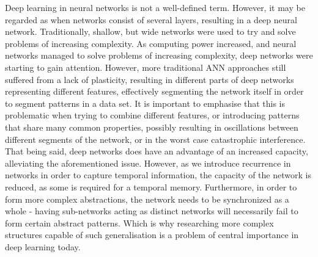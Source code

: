 
Deep learning in neural networks is not a well-defined term. However, it may be regarded as when networks consist of several layers, resulting in a deep neural network.
Traditionally, shallow, but wide networks were used to try and solve problems of increasing complexity.
As computing power increased, and neural networks managed to solve problems of increasing complexity, deep networks were starting to gain attention. However, more traditional ANN approaches still suffered from a lack of plasticity, resulting in different parts of deep networks representing different features, effectively segmenting the network itself in order to segment patterns in a data set. It is important to emphasise that this is problematic when trying to combine different features, or introducing patterns that share many common properties, possibly resulting in oscillations between different segments of the network, or in the worst case catastrophic interference.
That being said, deep networks does have an advantage of an increased capacity, alleviating the aforementioned issue. However, as we introduce recurrence in networks in order to capture temporal information, the capacity of the network is reduced, as some is required for a temporal memory. Furthermore, in order to form more complex abstractions, the network needs to be synchronized as a whole - having sub-networks acting as distinct networks will necessarily fail to form certain abstract patterns. Which is why researching more complex structures capable of such generalisation is a problem of central importance in deep learning today.
\\

